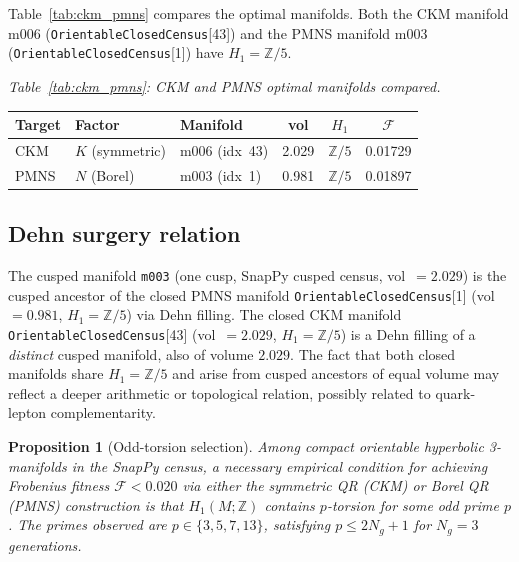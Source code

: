 \documentclass[floatfix,aps,prd,twocolumn,showpacs,superscriptaddress,longbibliography]{revtex4-2}
\newtheorem{proposition}{Proposition}
\begin{document}
Table~\ref{tab:ckm_pmns} compares the optimal manifolds.
Both the CKM manifold m006 (\texttt{OrientableClosedCensus}[43])
and the PMNS manifold m003 (\texttt{OrientableClosedCensus}[1])
have $H_1 = \mathbb{Z}/5$.


\begin{center}
\textit{Table~\ref{tab:ckm_pmns}: CKM and PMNS optimal manifolds compared.}\label{tab:ckm_pmns}\\
\smallskip
\begin{tabular}{lllccc}
\toprule
Target & Factor & Manifold & vol & $H_1$ & $\mathcal{F}$ \\
\midrule
CKM  & $K$ (symmetric) & m006 (idx~43) & 2.029 & $\mathbb{Z}/5$ & 0.01729 \\
PMNS & $N$ (Borel)     & m003 (idx~1)  & 0.981 & $\mathbb{Z}/5$ & 0.01897 \\
\bottomrule
\end{tabular}
\end{center}


\subsection{Dehn surgery relation}

The cusped manifold \texttt{m003} (one cusp, SnapPy cusped census,
vol~$= 2.029$) is the cusped ancestor of the closed PMNS manifold
\texttt{OrientableClosedCensus}[1] (vol~$= 0.981$, $H_1 = \mathbb{Z}/5$)
via Dehn filling.
The closed CKM manifold \texttt{OrientableClosedCensus}[43]
(vol~$= 2.029$, $H_1 = \mathbb{Z}/5$) is a Dehn filling of a
\emph{distinct} cusped manifold, also of volume $2.029$.
The fact that both closed manifolds share $H_1 = \mathbb{Z}/5$ and
arise from cusped ancestors of equal volume may reflect a deeper
arithmetic or topological relation, possibly related to
quark-lepton complementarity.

\begin{proposition}[Odd-torsion selection]
\label{prop:oddtorsion}
Among compact orientable hyperbolic 3-manifolds in the SnapPy census,
a necessary empirical condition for achieving Frobenius fitness
$\mathcal{F} < 0.020$ via either the symmetric QR \emph{(CKM)} or
Borel QR \emph{(PMNS)} construction is that $H_1(M;\mathbb{Z})$
contains $p$-torsion for some odd prime $p$.
The primes observed are $p \in \{3, 5, 7, 13\}$, satisfying
$p \leq 2N_g + 1$ for $N_g = 3$ generations.
\end{proposition}

\end{document}
